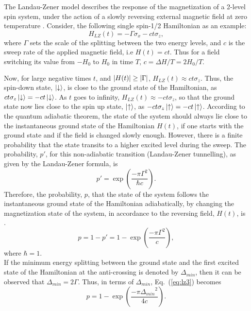 \documentclass[../main.tex]{subfiles}
\begin{document}
The Landau-Zener model describes the response of the magnetization of a 2-level spin system, under the action of a slowly reversing external magnetic field at zero temperature \cite{landau1932theorie,zener1932non,de1997theory}. Consider, the following single spin-1/2 Hamiltonian as an example:
\begin{equation}
H_{LZ}(t)=-\Gamma \sigma_x -c t \sigma_z, \label{eq:lz1}
\end{equation}
where $\Gamma$ sets the scale of the splitting between the two energy levels, and $c$ is the sweep rate of the applied magnetic field, i.e $H(t)=ct$. Thus for a field switching its value from $-H_0$ to $H_0$ in time $T$, $c=\Delta H/T= 2H_0/T$.

Now, for large negative times $t$, and $\abs{H(t)} \geq \abs{\Gamma}$, $H_{LZ}(t)\approx ct \sigma_z$. Thus, the spin-down state, $\ket{\downarrow}$, is close to the ground state of the Hamiltonian, as $ct \sigma_z \ket{\downarrow}=-ct \ket{\downarrow}$. As $t$ goes to infinity, $H_{LZ}(t)\approx -ct \sigma_z$, so that the ground state now lies close to the spin up state, $\ket{\uparrow}$, as $-ct \sigma_z \ket{\uparrow}=-ct \ket{\uparrow}$. According to the quantum adiabatic theorem, the state of the system should always lie close to the instantaneous ground state of the Hamiltonian $H(t)$, if one starts with the ground state and if the field is changed slowly enough. However, there is a finite probability that the state transits to a higher excited level during the sweep. The probability, $p'$, for this non-adiabatic transition (Landau-Zener tunnelling), as given by the Landau-Zener formula, is
\begin{equation}
p'=\exp(\frac{-\pi {\Gamma}^2}{\hbar c}) . 
\end{equation}
Therefore, the probability, $p$, that the state of the system follows the instantaneous ground state of the Hamiltonian adiabatically, by changing the magnetization state of the system, in accordance to the reversing field, $H(t)$, is \cite{landau1932theorie,zener1932non,de1997theory,miyashita1995dynamics}.
\begin{equation}
p=1-p'=1-\exp(\frac{-\pi {\Gamma}^2}{c}) ,   \label{eq:lz2}
\end{equation}
where $\hbar=1$.\\
If the minimum energy splitting between the ground state and the first excited state of the Hamiltonian at the anti-crossing is denoted by $\Delta_{min}$, then it can be observed that $\Delta_{min}= 2 \Gamma$. Thus, in terms of $\Delta_{min}$, Eq.~(\ref{eq:lz3}) becomes 
\begin{equation}
p=1-\exp(\frac{-\pi {\Delta_{min}}^2}{4c}) .   \label{eq:lz3}
\end{equation}
\end{document}
